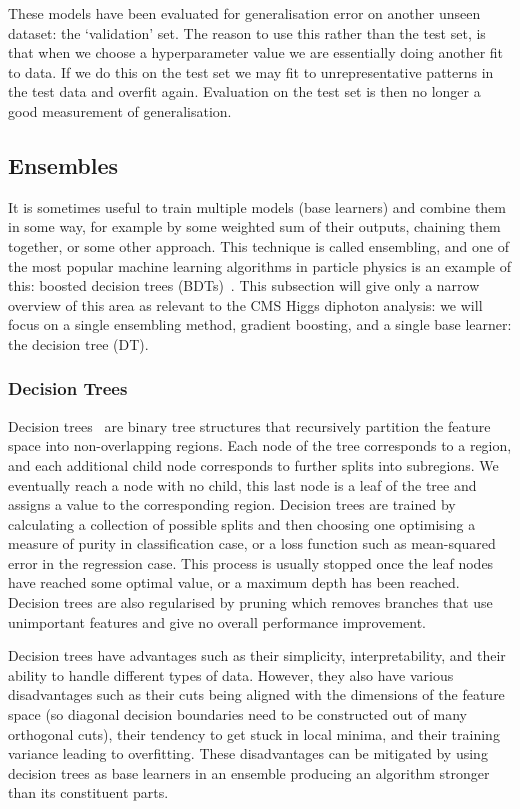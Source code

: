 These models have been evaluated for generalisation error on another unseen dataset: the `validation' set. The reason to use this rather than the test set, is that when we choose a hyperparameter value we are essentially doing another fit to data. If we do this on the test set we may fit to unrepresentative patterns in the test data and overfit again. Evaluation on the test set is then no longer a good measurement of generalisation. 








\subsection{Ensembles}
It is sometimes useful to train multiple models (base learners) and combine them in some way, for example by some weighted sum of their outputs, chaining them together, or some other approach. This technique is called ensembling, and one of the most popular machine learning algorithms in particle physics is an example of this: boosted decision trees (BDTs)~\cite{MiniBooneBDT}. This subsection will give only a narrow overview of this area as relevant to the CMS Higgs diphoton analysis: we will focus on a single ensembling method, gradient boosting, and a single base learner: the decision tree (DT).


\subsubsection{Decision Trees}
Decision trees~\cite{DecisionTrees} are binary tree structures that recursively partition the feature space into non-overlapping regions. Each node of the tree corresponds to a region, and each additional child node corresponds to further splits into subregions. We eventually reach a node with no child, this last node is a leaf of the tree and assigns a value to the corresponding region.  
Decision trees are trained by calculating a collection of possible splits and then choosing one optimising a measure of purity in classification case, or a loss function such as mean-squared error in the regression case. This process is usually stopped once the leaf nodes have reached some optimal value, or a maximum depth has been reached. 
Decision trees are also regularised by pruning which removes branches that use unimportant features and give no overall performance improvement. 

Decision trees have advantages such as their simplicity, interpretability, and their ability to handle different types of data. However, they also have various disadvantages such as their cuts being aligned with the dimensions of the feature space (so diagonal decision boundaries need to be constructed out of many orthogonal cuts), their tendency to get stuck in local minima, and their training variance leading to overfitting. These disadvantages can be mitigated by using decision trees as base learners in an ensemble producing an algorithm stronger than its constituent parts. 


